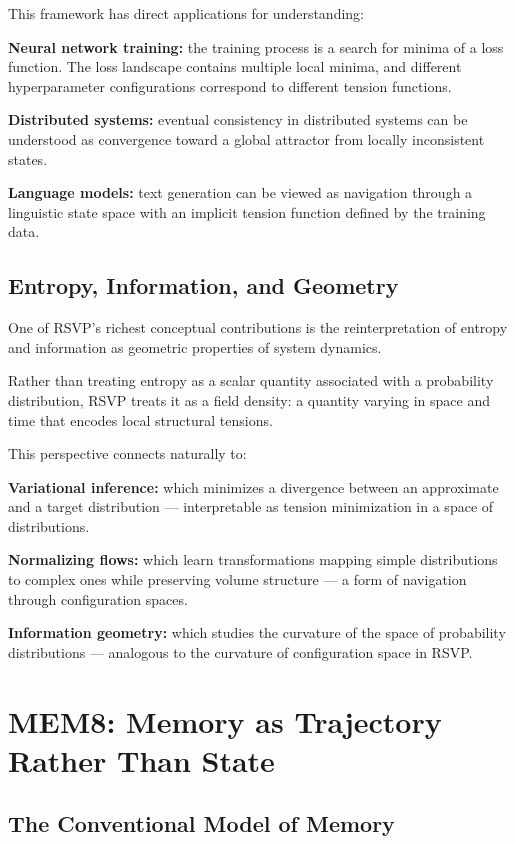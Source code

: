 \documentclass[11pt, a4paper]{article}
\theoremstyle{named}
\begin{document}
This framework has direct applications for understanding:

\textbf{Neural network training:} the training process is a search
for minima of a loss function. The loss landscape contains multiple
local minima, and different hyperparameter configurations correspond
to different tension functions.

\textbf{Distributed systems:} eventual consistency in distributed
systems can be understood as convergence toward a global attractor
from locally inconsistent states.

\textbf{Language models:} text generation can be viewed as navigation
through a linguistic state space with an implicit tension function
defined by the training data.

\subsection{Entropy, Information, and Geometry}

One of RSVP's richest conceptual contributions is the reinterpretation
of entropy and information as geometric properties of system dynamics.

Rather than treating entropy as a scalar quantity associated with a
probability distribution, RSVP treats it as a field density: a
quantity varying in space and time that encodes local structural
tensions.

This perspective connects naturally to:

\textbf{Variational inference:} which minimizes a divergence between
an approximate and a target distribution --- interpretable as tension
minimization in a space of distributions.

\textbf{Normalizing flows:} which learn transformations mapping simple
distributions to complex ones while preserving volume structure --- a
form of navigation through configuration spaces.

\textbf{Information geometry:} which studies the curvature of the
space of probability distributions --- analogous to the curvature of
configuration space in RSVP.

\section{MEM\textbar{}8: Memory as Trajectory Rather Than State}

\subsection{The Conventional Model of Memory}
\end{document}

